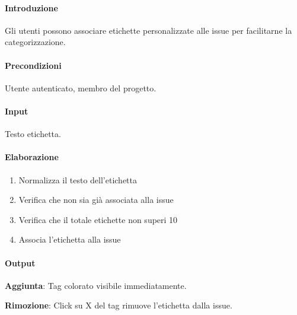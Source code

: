 \vspace{0.5cm}

\newpage


\begin{reqbox}[title=REQ-FUN-13: Aggiungi Etichette]
\label{subsubsec:req-aggiungi-etichette}

\paragraph{Introduzione}
Gli utenti possono associare etichette personalizzate alle issue per facilitarne la categorizzazione.

\paragraph{Precondizioni}
Utente autenticato, membro del progetto.

\paragraph{Input}
Testo etichetta.

\paragraph{Elaborazione}
\begin{enumerate}[leftmargin=1.1em]
\item Normalizza il testo dell'etichetta
\item Verifica che non sia già associata alla issue
\item Verifica che il totale etichette non superi 10
\item Associa l'etichetta alla issue
\end{enumerate}

\paragraph{Output}
\textbf{Aggiunta}: Tag colorato visibile immediatamente.

\textbf{Rimozione}: Click su X del tag rimuove l'etichetta dalla issue.

\end{reqbox}

\vspace{0.5cm}


